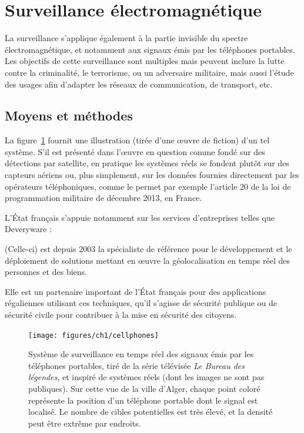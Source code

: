 	
	\section{Surveillance électromagnétique}
	La surveillance s'applique également à la partie invisible du spectre électromagnétique, et notamment aux signaux émis par les téléphones portables. Les objectifs de cette surveillance sont multiples mais peuvent inclure la lutte contre la criminalité, le terrorisme, ou un adversaire militaire, mais aussi l'étude des usages afin d'adapter les réseaux de communication, de transport, etc.	
	
	\FloatBarrier \subsection{Moyens et méthodes}
	La figure~\ref{fig:cellphones} fournit une illustration (tirée d'une œuvre de fiction) d'un tel système. S'il est présenté dans l'œuvre en question comme fondé sur des détections par satellite, en pratique les systèmes réels se fondent plutôt sur des capteurs aériens ou, plus simplement, sur les données fournies directement par les opérateurs téléphoniques, comme le permet par exemple l'article 20 de la loi de programmation militaire de décembre 2013, en France\footnotemark.
	
	
	L'État français s'appuie notamment sur les services d'entreprises telles que Deveryware :
	
	\begin{displayquote}
		(Celle-ci) est depuis 2003 la spécialiste de référence pour le développement et le déploiement de solutions mettant en œuvre la géolocalisation en temps réel des personnes et des biens.

		Elle est un partenaire important de l'État français pour des applications régaliennes utilisant ces techniques, qu'il s'agisse de sécurité publique ou de sécurité civile pour contribuer à la mise en sécurité des citoyens.\footnotemark{}
	\end{displayquote}
	
	
	\begin{figure}[!htbp]
		\centering
		\texttt{[image: figures/ch1/cellphones]}
		\caption[Surveillance des signaux de téléphones portables]{Système de surveillance en temps réel des signaux émis par les téléphones portables, tiré de la série télévisée \emph{Le Bureau des légendes}\footnotemark{}, et inspiré de systèmes réels (dont les images ne sont pas publiques). Sur cette vue de la ville d'Alger, chaque point coloré représente la position d'un téléphone portable dont le signal est localisé. Le nombre de cibles potentielles est très élevé, et la densité peut être extrême par endroits.}
		\label{fig:cellphones}
	\end{figure}
	
